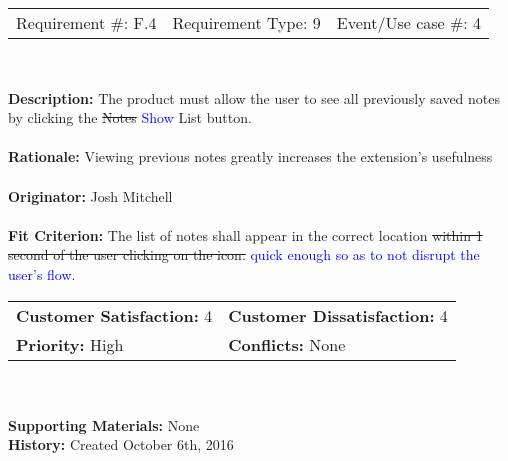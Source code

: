 \documentclass[12pt, titlepage]{article}
\begin{document}
\begin{framed}
	
	\begin{center}
		
		\begin{tabular}{ l c r }
			Requirement \#: F.4 & Requirement Type: 9 & Event/Use case \#: 4\\
		\end{tabular} \\
	\end{center}
	\textbf{Description:} The product must allow the user to see all previously 
	saved notes by clicking the \sout{Notes} \textcolor{blue}{Show} List 
	button.\\
	\\
	\textbf{Rationale:} Viewing previous notes greatly increases the 
	extension's usefulness \\
	\\
	\textbf{Originator:} Josh Mitchell \\
	\\
	\textbf{Fit Criterion:} The list of notes shall appear in the correct 
	location \sout{within 1 second of the user clicking on the icon.} 
	\textcolor{blue}{quick enough so as to not disrupt the user's flow.} \\
	
	\begin{tabular}{ll}
		\textbf{Customer Satisfaction:} 4 & \textbf{Customer Dissatisfaction:} 
		4 \\
		\textbf{Priority:} High & \textbf{Conflicts:} None\\
	\end{tabular} \\
	\\
	\textbf{Supporting Materials:} None \\
	\textbf{History:} Created October 6th, 2016
	
\end{framed}
\end{document}

